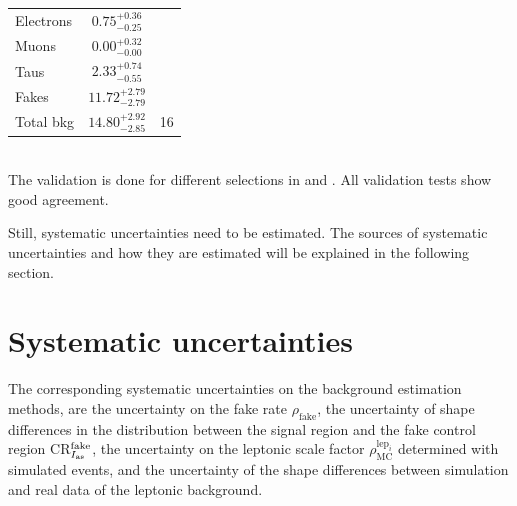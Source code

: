 \begin{table}[!h]
{\begin{tabular}{l|c |c}
\midrule
Electrons                                                      &       $0.75^{ + 0.36}_{ - 0.25}$            &                \\
Muons                                                          &       $0.00^{ + 0.32}_{- 0.00}$            &            \\
Taus                                                           &       $2.33^{ + 0.74}_{- 0.55}$            &          \\
Fakes                                                          &       $11.72^{ + 2.79}_{- 2.79}$            &          \\
\midrule
Total bkg                                                      &       $14.80^{ + 2.92}_{- 2.85}$            &  16        \\
\bottomrule
\end{tabular}}
\end{table}\\




The validation is done for different selections in \pt and \ias.
All validation tests show good agreement.

Still, systematic uncertainties need to be estimated.
The sources of systematic uncertainties and how they are estimated will be explained in the following section.

\section{Systematic uncertainties}
\label{sec:SysUncertaintiesBkg}

The corresponding systematic uncertainties on the background estimation methods, are the uncertainty on the fake rate $\rho_{\text{fake}}$, the uncertainty of shape differences in the \ias distribution between the signal region and the fake control region CR$_{I_{\text{as}}}^{\text{fake}}$, the uncertainty on the leptonic scale factor $\rho_{\text{MC}}^{\text{lep}_i}$ determined with simulated events, and the uncertainty of the shape differences between simulation and real data of the leptonic background.  

